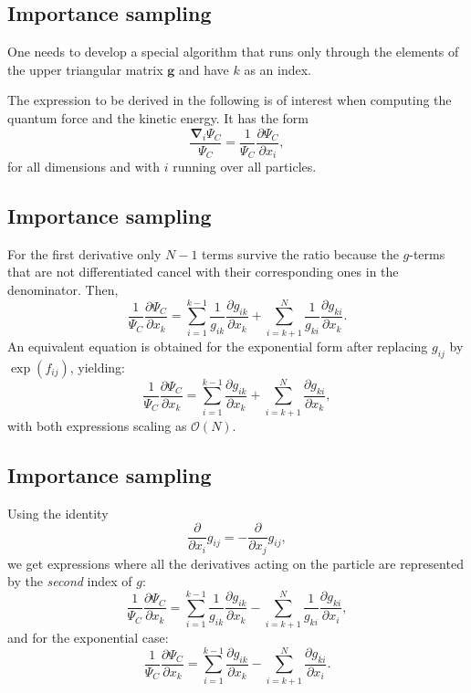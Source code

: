 \documentclass[%
oneside,                 %
final,                   %
10pt]{article}
\begin{document}
\subsection{Importance sampling}

One needs to develop a special algorithm 
that runs only through the elements of the upper triangular
matrix $\mathbf{g}$ and have $k$ as an index. 

The expression to be derived in the following is of interest when computing the quantum force and the kinetic energy. It has the form
\[
\frac{\mathbf{\nabla}_i\Psi_C}{\Psi_C} = \frac{1}{\Psi_C}\frac{\partial \Psi_C}{\partial x_i},
\]
for all dimensions and with $i$ running over all particles.

\subsection{Importance sampling}

For the first derivative only $N-1$ terms survive the ratio because the $g$-terms that are not differentiated cancel with their corresponding ones in the denominator. Then,
\[
\frac{1}{\Psi_C}\frac{\partial \Psi_C}{\partial x_k} =
\sum_{i=1}^{k-1}\frac{1}{g_{ik}}\frac{\partial g_{ik}}{\partial x_k}
+
\sum_{i=k+1}^{N}\frac{1}{g_{ki}}\frac{\partial g_{ki}}{\partial x_k}.
\]
An equivalent equation is obtained for the exponential form after replacing $g_{ij}$ by $\exp(f_{ij})$, yielding:
\[
\frac{1}{\Psi_C}\frac{\partial \Psi_C}{\partial x_k} =
\sum_{i=1}^{k-1}\frac{\partial g_{ik}}{\partial x_k}
+
\sum_{i=k+1}^{N}\frac{\partial g_{ki}}{\partial x_k},
\]
with both expressions scaling as $\mathcal{O}(N)$.

\subsection{Importance sampling}

Using the identity 
\[
\frac{\partial}{\partial x_i}g_{ij} = -\frac{\partial}{\partial x_j}g_{ij},
\]
we get expressions where all the derivatives acting on the particle  are represented by the \emph{second} index of $g$:
\[
\frac{1}{\Psi_C}\frac{\partial \Psi_C}{\partial x_k} =
\sum_{i=1}^{k-1}\frac{1}{g_{ik}}\frac{\partial g_{ik}}{\partial x_k}
-\sum_{i=k+1}^{N}\frac{1}{g_{ki}}\frac{\partial g_{ki}}{\partial x_i},
\]
and for the exponential case:
\[
\frac{1}{\Psi_C}\frac{\partial \Psi_C}{\partial x_k} =
\sum_{i=1}^{k-1}\frac{\partial g_{ik}}{\partial x_k}
-\sum_{i=k+1}^{N}\frac{\partial g_{ki}}{\partial x_i}.
\]
\end{document}
